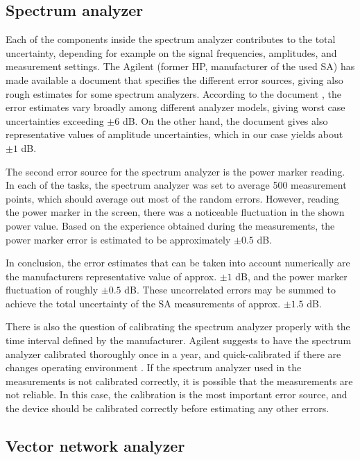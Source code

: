 \documentclass[a4paper, 12pt]{article}
\begin{document}
\subsection{Spectrum analyzer}

Each of the components inside the spectrum analyzer contributes to the total uncertainty, 
depending for example on the signal frequencies, amplitudes, and measurement settings. 
The Agilent (former HP, manufacturer of the used SA) has made available a document that 
specifies the different error sources, giving also rough estimates for some spectrum 
analyzers. According to the document \cite{sa}, the error estimates vary broadly among 
different analyzer models, giving worst case uncertainties exceeding $\pm 6$ dB. On the 
other hand, the document gives also representative values of amplitude uncertainties, 
which in our case yields about $\pm 1$ dB.

The second error source for the spectrum analyzer is the power marker reading. In 
each of the tasks, the spectrum analyzer was set to average 500 measurement points, 
which should average out most of the random errors. However, reading the power marker 
in the screen, there was a noticeable fluctuation in the shown power value. Based on the 
experience obtained during the measurements, the power marker error is estimated to be 
approximately $\pm 0.5$ dB.

In conclusion, the error estimates that can be taken into account numerically are 
the manufacturers representative value of approx. $\pm 1$ dB, and the power marker 
fluctuation of roughly $\pm 0.5$ dB. These uncorrelated errors may be summed to 
achieve the total uncertainty of the SA measurements of approx. $\pm 1.5$ dB. 

There is also the question of calibrating the spectrum analyzer properly with 
the time interval defined by the manufacturer. Agilent suggests to have the spectrum 
analyzer calibrated thoroughly once in a year, and quick-calibrated if there are 
changes operating environment \cite{sa2}. If the spectrum analyzer used in the 
measurements is not calibrated correctly, it is possible that the measurements are 
not reliable. In this case, the calibration is the most important error source, and 
the device should be calibrated correctly before estimating any other errors.


\subsection{Vector network analyzer}
\end{document}

